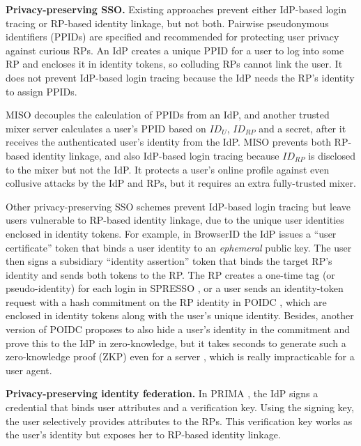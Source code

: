 \noindent\textbf{Privacy-preserving SSO.}
Existing approaches \cite{BrowserID, SPRESSO, NIST2017draft} prevent either IdP-based login tracing or RP-based identity linkage, but not both.
Pairwise pseudonymous identifiers (PPIDs) are specified \cite{OpenIDConnect, SAMLIdentifier} and recommended \cite{NIST2017draft}
for protecting user privacy against curious RPs.
An IdP creates a unique PPID for a user to log into some RP and encloses it in identity tokens, so colluding RPs cannot link the user.
It does not prevent IdP-based login tracing because the IdP needs the RP's identity to assign PPIDs.

MISO \cite{miso} decouples the calculation of PPIDs from an IdP,
        and another trusted mixer server calculates a user's PPID
    based on $ID_U$, $ID_{RP}$ and a secret,
    after it receives the authenticated user's identity from the IdP.
MISO prevents both RP-based identity linkage, %
    and also IdP-based login tracing because $ID_{RP}$ is disclosed to the mixer but not the IdP.
It protects a user's online profile against even collusive attacks by the IdP and RPs,
    but it requires an extra fully-trusted mixer.


Other privacy-preserving SSO schemes prevent IdP-based login tracing but leave users vulnerable to RP-based identity linkage, due to the unique user identities enclosed in identity tokens.
For example, in BrowserID \cite{BrowserID} 
the IdP %
issues a ``user certificate'' token that binds a user identity to an \emph{ephemeral} public key. The user then signs a subsidiary ``identity assertion'' token that binds the target RP's identity and sends both tokens to the RP.
The RP creates a one-time tag (or pseudo-identity) for each login in SPRESSO \cite{SPRESSO}, 
 or a user sends an identity-token request with a hash commitment on the RP identity in POIDC \cite{POIDC,save-flow},
        which are enclosed in identity tokens along with the user's unique identity.
Besides, another version of POIDC \cite{POIDC} proposes to also hide a user's identity in the commitment and prove this to the IdP in zero-knowledge,
        but it takes seconds to generate such a zero-knowledge proof (ZKP) even for a server \cite{zkp-benchmark},
        which is really impracticable for a user agent.

\noindent\textbf{Privacy-preserving identity federation.}
In PRIMA \cite{prima}, the IdP signs a credential
that binds user attributes and a verification key. Using the signing key, the user selectively provides attributes to the RPs. This verification key works as the user's identity but exposes her to RP-based identity linkage.

